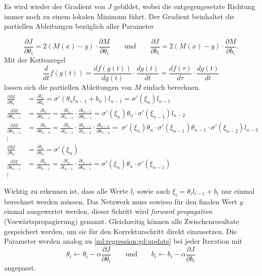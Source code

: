 Es wird wieder der Gradient von $J$ gebildet, wobei die entgegengesetzte Richtung immer
noch zu einem lokalen Minimum führt. Der Gradient beinhaltet die partiellen Ableitungen
bezüglich aller Parameter

\begin{equation}
    \frac{\partial J}{\partial \theta_i} = 2(M(x) - y) \cdot \frac{\partial M}{\partial \theta_i}
    \qquad\text{und}\qquad
    \frac{\partial J}{\partial b_i} = 2(M(x) - y) \cdot \frac{\partial M}{\partial b_i}.
\end{equation}
Mit der Kettenregel
\begin{equation}
    \frac{d}{dt}f(g(t)) = \frac{df(g(t))}{d g(t)} \cdot \frac{d g(t)}{dt} = \frac{df(\tau)}{d \tau} \cdot \frac{d g(t)}{dt}
\end{equation}
lassen sich die partiellen Ableitungen von $M$ einfach berechnen.
\begin{equation}
\begin{aligned}
    \frac{\partial M}{\partial \theta_n} &= \frac{\partial l_n}{\partial \theta_n} =
    \sigma'(\theta_n l_{n-1} + b_n) l_{n-1} = \sigma'(\xi_n)l_{n-1} \\
    \frac{\partial M}{\partial \theta_{n-1}} &= \frac{\partial l_{n}}{\partial \theta_{n-1}}
    = \frac{\partial l_n}{\partial l_{n-1}} \cdot \frac{\partial
    l_{n-1}}{\partial \theta_{n-1}} = 
    \sigma'(\xi_n) \theta_n \cdot \sigma'(\xi_{n-1}) l_{n-2}
    \\
    \frac{\partial M}{\partial \theta_{n-2}} &= \frac{\partial l_{n}}{\partial \theta_{n-2}}
    = \frac{\partial l_n}{\partial l_{n-1}} \cdot \frac{\partial
    l_{n-1}}{\partial l_{n-2}}\cdot \frac{\partial l_{n-2}}{\partial \theta_{n-2}} =
    \; \sigma'(\xi_n)\theta_n \cdot \sigma'(\xi_{n-1})\theta_{n-1}\cdot \sigma'(\xi_{n-2})l_{n-3}
    \\
    \vdots\quad&\\
    \frac{\partial M}{\partial b_n} &= \frac{\partial l_n}{\partial b_n} =
    \sigma'(\xi_n) \\
    \frac{\partial M}{\partial b_{n-1}} &= \frac{\partial l_{n}}{\partial b_{n-1}}
    = \frac{\partial l_n}{\partial l_{n-1}} \cdot \frac{\partial
    l_{n-1}}{\partial b_{n-1}} = 
    \sigma'(\xi_n) \theta_n \cdot \sigma'(\xi_{n-1}) \\
    \vdots\quad&
\end{aligned}
\end{equation}

Wichtig zu erkennen ist, dass alle Werte $l_i$ sowie auch $\xi_i=\theta_i l_{i-1}+b_i$ nur
einmal berechnet werden müssen. Das Netzwerk muss sowieso für den finalen Wert $y$ einmal
ausgewertet werden, dieser Schritt wird \emph{forward propagation} (Vorwärtspropagierung)
genannt. Gleichzeitig können alle Zwischenresultate gespeichert werden, um sie für den
Korrekturschritt direkt einzusetzen.
Die Parameter werden analog zu \eqref{ml:regression:gd:update} bei jeder Iteration mit
\begin{equation}
    \theta_i \leftarrow \theta_i - \alpha \frac{\partial J}{\partial \theta_i}
    \qquad\text{und}\qquad
    b_i \leftarrow b_i - \alpha \frac{\partial J}{\partial b_i}
\end{equation}
angepasst.

